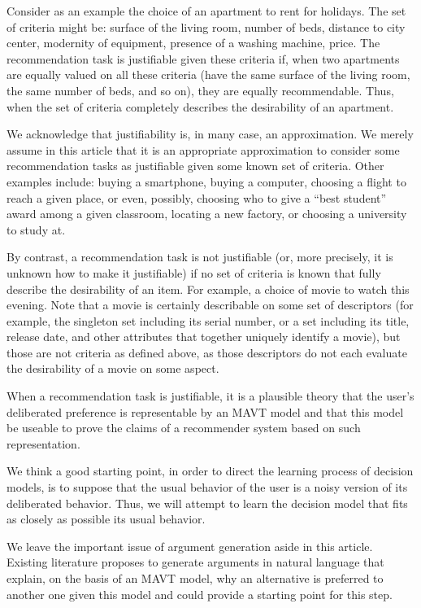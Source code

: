 \documentclass[french, english]{da2pl2018}
\begin{document}
Consider as an example the choice of an apartment to rent for holidays. The set of criteria might be: surface of the living room, number of beds, distance to city center, modernity of equipment, presence of a washing machine, price. The recommendation task is justifiable given these criteria if, when two apartments are equally valued on all these criteria (have the same surface of the living room, the same number of beds, and so on), they are equally recommendable. Thus, when the set of criteria completely describes the desirability of an apartment.

We acknowledge that justifiability is, in many case, an approximation. We merely assume in this article that it is an appropriate approximation to consider some recommendation tasks as justifiable given some known set of criteria. Other examples include: buying a smartphone, buying a computer, choosing a flight to reach a given place, or even, possibly, choosing who to give a “best student” award among a given classroom, locating a new factory, or choosing a university to study at.

By contrast, a recommendation task is not justifiable (or, more precisely, it is unknown how to make it justifiable) if no set of criteria is known that fully describe the desirability of an item. For example, a choice of movie to watch this evening. Note that a movie is certainly describable on some set of descriptors (for example, the singleton set including its serial number, or a set including its title, release date, and other attributes that together uniquely identify a movie), but those are not criteria as defined above, as those descriptors do not each evaluate the desirability of a movie on some aspect.

When a recommendation task is justifiable, it is a plausible theory that the user’s deliberated preference is representable by an MAVT model and that this model be useable to prove the claims of a recommender system based on such representation.

We think a good starting point, in order to direct the learning process of decision models, is to suppose that the usual behavior of the user is a noisy version of its deliberated behavior. Thus, we will attempt to learn the decision model that fits as closely as possible its usual behavior. 

We leave the important issue of argument generation aside in this article. Existing literature proposes to generate arguments in natural language that explain, on the basis of an MAVT model, why an alternative is preferred to another one given this model and could provide a starting point for this step. 
\end{document}
